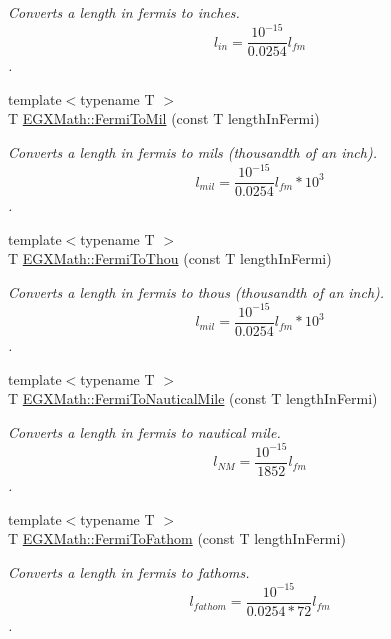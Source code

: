 \begin{DoxyCompactItemize}
\begin{DoxyCompactList}\small\item\em Converts a length in fermis to inches. \[ l_{in}= \frac{10^{-15}}{0.0254} l_{fm} \]. \end{DoxyCompactList}\item 
{\footnotesize template$<$typename T $>$ }\\T \mbox{\hyperlink{group___e_g_x_math-_conversions-_length_conversions-_non-_s_i-_fermi-_imperial_ga8559f43da08dbb3b2e09fab322904953}{E\+G\+X\+Math\+::\+Fermi\+To\+Mil}} (const T length\+In\+Fermi)
\begin{DoxyCompactList}\small\item\em Converts a length in fermis to mils (thousandth of an inch). \[ l_{mil}= \frac{10^{-15}}{0.0254} l_{fm} * 10^{3} \]. \end{DoxyCompactList}\item 
{\footnotesize template$<$typename T $>$ }\\T \mbox{\hyperlink{group___e_g_x_math-_conversions-_length_conversions-_non-_s_i-_fermi-_imperial_ga370507ab066f38bc761a2ecd2b55c670}{E\+G\+X\+Math\+::\+Fermi\+To\+Thou}} (const T length\+In\+Fermi)
\begin{DoxyCompactList}\small\item\em Converts a length in fermis to thous (thousandth of an inch). \[ l_{mil}= \frac{10^{-15}}{0.0254} l_{fm} * 10^{3} \]. \end{DoxyCompactList}\item 
{\footnotesize template$<$typename T $>$ }\\T \mbox{\hyperlink{group___e_g_x_math-_conversions-_length_conversions-_non-_s_i-_fermi-_nautical_gac5966592cf227d0a5aa87ead6a4ca7d8}{E\+G\+X\+Math\+::\+Fermi\+To\+Nautical\+Mile}} (const T length\+In\+Fermi)
\begin{DoxyCompactList}\small\item\em Converts a length in fermis to nautical mile. \[ l_{NM}= \frac{10^{-15}}{1852} l_{fm} \]. \end{DoxyCompactList}\item 
{\footnotesize template$<$typename T $>$ }\\T \mbox{\hyperlink{group___e_g_x_math-_conversions-_length_conversions-_non-_s_i-_fermi-_nautical_ga4c2e2453ec319beb8e5a397ded99967a}{E\+G\+X\+Math\+::\+Fermi\+To\+Fathom}} (const T length\+In\+Fermi)
\begin{DoxyCompactList}\small\item\em Converts a length in fermis to fathoms. \[ l_{fathom}= \frac{10^{-15}}{0.0254 * 72} l_{fm} \]. \end{DoxyCompactList}\item 

\end{DoxyCompactItemize}
